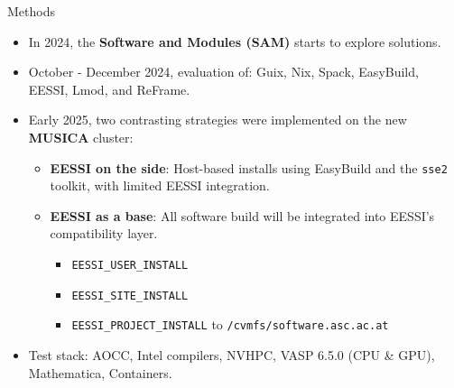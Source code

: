 \documentclass[final]{beamer}
\begin{document}
\begin{frame}[t]
\begin{columns}[t]
\begin{column}{0.48\textwidth}
    \begin{block}{Methods}
        \begin{itemize}
          \item In 2024, the \textbf{Software and Modules (SAM)} starts to explore solutions.
          \item October - December 2024, evaluation of: Guix, Nix, Spack, EasyBuild, EESSI, Lmod, and ReFrame.
          \item Early 2025, two contrasting strategies were implemented on the new \textbf{MUSICA} cluster:
          \begin{itemize}
            \item \textbf{EESSI on the side}: Host-based installs using EasyBuild and the \texttt{sse2} toolkit, with limited EESSI integration.
            \item \textbf{EESSI as a base}: All software build will be integrated into EESSI's compatibility layer.
                \begin{itemize}
                  \item \texttt{EESSI\_USER\_INSTALL}
                  \item \texttt{EESSI\_SITE\_INSTALL}
                  \item \texttt{EESSI\_PROJECT\_INSTALL} to \texttt{/cvmfs/software.asc.ac.at}
                \end{itemize}
          \end{itemize}
          \item Test stack: AOCC, Intel compilers, NVHPC, VASP 6.5.0 (CPU \& GPU), Mathematica, Containers.

        \end{itemize}
    \end{block}
    \vfill


\end{column}
\end{columns}
\end{frame}
\end{document}
